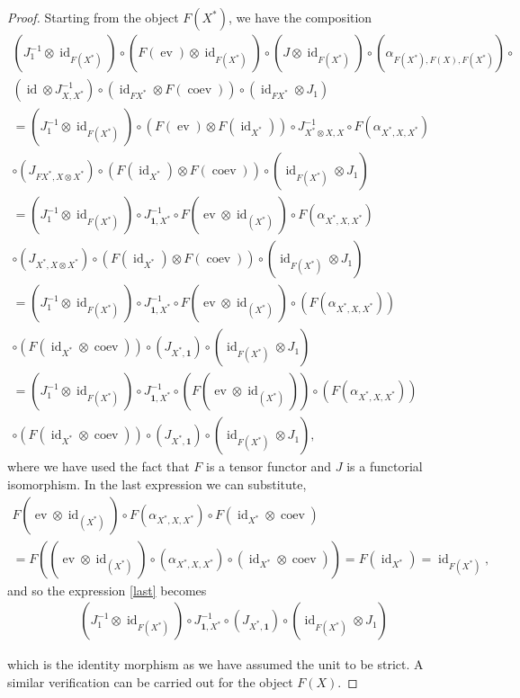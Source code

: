 \documentclass[11pt]{book}
\theoremstyle{Rem}
\theoremstyle{definition}
\numberwithin{equation}{section}
\newcommand\inv{^{-1}}
\newcommand\id{\operatorname{id}}
\newcommand\one{\mathbf{1}}
\newcommand\ev{\operatorname{ev}}
\newcommand\coev{\operatorname{coev}}
\begin{document}
\begin{proof}
Starting from the object $F(X^*)$, we have the composition 
\begin{align}
	(J_1\inv \otimes \id_{F(X^*)})\circ(F(\ev)\otimes \id_{F(X^*)})\circ (J\otimes \id_{F(X^*)}) \circ (\alpha_{F(X^*), F(X), F(X^*)})\circ \nonumber\\(\id \otimes J\inv_{X, X^*})\circ (\id_{FX^*}\otimes F(\coev))\circ (\id_{FX^*}\otimes J_1 )\\
	=(J_1\inv \otimes \id_{F(X^*)})\circ(F(\ev)\otimes F(\id_{X^*}))\circ J\inv_{X^*\otimes X, X}\circ F(\alpha_{X^*, X, X^*})\nonumber\\\circ (J_{FX^*, X\otimes X^*})\circ (F(\id_{X^*}) \otimes F(\coev))\circ (\id_{F(X^*)}\otimes J_1 )\\
	=(J_1\inv \otimes \id_{F(X^*)})\circ J\inv_{\one, X^*}\circ F(\ev \otimes \id_{(X^*)})\circ F(\alpha_{X^*, X, X^*})\nonumber\\\circ (J_{X^*, X\otimes X^*})\circ (F(\id_{X^*}) \otimes F(\coev))\circ (\id_{F(X^*)}\otimes J_1 )\\
	=(J_1\inv \otimes \id_{F(X^*)})\circ J\inv_{\one, X^*}\circ F(\ev \otimes \id_{(X^*)})\circ (F(\alpha_{X^*, X, X^*}))\nonumber\\\circ (F(\id_{X^*}\otimes\coev))\circ (J_{X^*, \one})\circ (\id_{F(X^*)}\otimes J_1 )\\
	=(J_1\inv \otimes \id_{F(X^*)})\circ J\inv_{\one, X^*}\circ(F(\ev \otimes \id_{(X^*)}))\circ (F(\alpha_{X^*, X, X^*}))\nonumber\\\circ (F(\id_{X^*}\otimes\coev))\circ (J_{X^*, \one})\circ (\id_{F(X^*)}\otimes J_1 )\label{last},
\end{align}
where we have used the fact that $F$ is a tensor functor and $J$ is a functorial isomorphism. In the last expression we can substitute,
\begin{align}
	F(\ev \otimes \id_{(X^*)})\circ F(\alpha_{X^*, X, X^*})\circ F(\id_{X^*}\otimes\coev)\nonumber\\ = F ((\ev \otimes \id_{(X^*)})\circ (\alpha_{X^*, X, X^*})\circ(\id_{X^*}\otimes\coev)) = F(\id_{X^*})  = \id_{F(X^*)},
\end{align}
and so the expression \ref{last} becomes \begin{align}
(J_1\inv \otimes \id_{F(X^*)})\circ J\inv_{\one, X^*}\circ (J_{X^*, \one})\circ (\id_{F(X^*)}\otimes J_1 )
\end{align}

which is the identity morphism as we have assumed the unit to be strict. A similar verification can be carried out for the object $F(X)$.
\end{proof}
\end{document}

